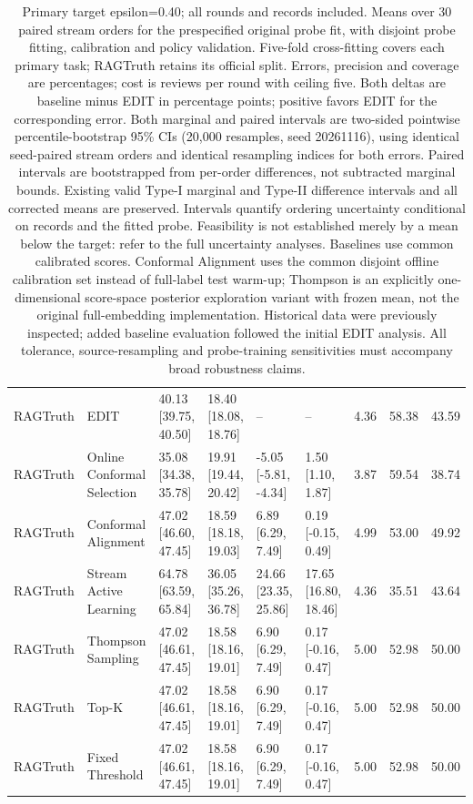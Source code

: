 \begin{table}[t]
{\begin{tabular}{llllllrrr}
\midrule
RAGTruth & EDIT & 40.13 [39.75, 40.50] & 18.40 [18.08, 18.76] & -- & -- & 4.36 & 58.38 & 43.59 \\
RAGTruth & Online Conformal Selection & 35.08 [34.38, 35.78] & 19.91 [19.44, 20.42] & -5.05 [-5.81, -4.34] & 1.50 [1.10, 1.87] & 3.87 & 59.54 & 38.74 \\
RAGTruth & Conformal Alignment & 47.02 [46.60, 47.45] & 18.59 [18.18, 19.03] & 6.89 [6.29, 7.49] & 0.19 [-0.15, 0.49] & 4.99 & 53.00 & 49.92 \\
RAGTruth & Stream Active Learning & 64.78 [63.59, 65.84] & 36.05 [35.26, 36.78] & 24.66 [23.35, 25.86] & 17.65 [16.80, 18.46] & 4.36 & 35.51 & 43.64 \\
RAGTruth & Thompson Sampling & 47.02 [46.61, 47.45] & 18.58 [18.16, 19.01] & 6.90 [6.29, 7.49] & 0.17 [-0.16, 0.47] & 5.00 & 52.98 & 50.00 \\
RAGTruth & Top-K & 47.02 [46.61, 47.45] & 18.58 [18.16, 19.01] & 6.90 [6.29, 7.49] & 0.17 [-0.16, 0.47] & 5.00 & 52.98 & 50.00 \\
RAGTruth & Fixed Threshold & 47.02 [46.61, 47.45] & 18.58 [18.16, 19.01] & 6.90 [6.29, 7.49] & 0.17 [-0.16, 0.47] & 5.00 & 52.98 & 50.00 \\
\midrule
\bottomrule
\end{tabular}}
\caption{Primary target epsilon=0.40; all rounds and records included. Means over 30 paired stream orders for the prespecified original probe fit, with disjoint probe fitting, calibration and policy validation. Five-fold cross-fitting covers each primary task; RAGTruth retains its official split. Errors, precision and coverage are percentages; cost is reviews per round with ceiling five. Both deltas are baseline minus EDIT in percentage points; positive favors EDIT for the corresponding error. Both marginal and paired intervals are two-sided pointwise percentile-bootstrap 95\% CIs (20,000 resamples, seed 20261116), using identical seed-paired stream orders and identical resampling indices for both errors. Paired intervals are bootstrapped from per-order differences, not subtracted marginal bounds. Existing valid Type-I marginal and Type-II difference intervals and all corrected means are preserved. Intervals quantify ordering uncertainty conditional on records and the fitted probe. Feasibility is not established merely by a mean below the target: refer to the full uncertainty analyses. Baselines use common calibrated scores. Conformal Alignment uses the common disjoint offline calibration set instead of full-label test warm-up; Thompson is an explicitly one-dimensional score-space posterior exploration variant with frozen mean, not the original full-embedding implementation. Historical data were previously inspected; added baseline evaluation followed the initial EDIT analysis. All tolerance, source-resampling and probe-training sensitivities must accompany broad robustness claims.}
\end{table}
